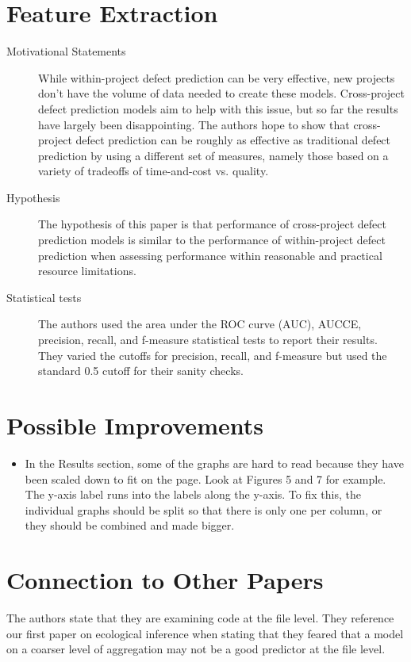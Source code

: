 \documentclass[english]{article}
\begin{document}
\section*{Feature Extraction}
\begin{description}
\item[{Motivational Statements}]  While within-project defect prediction can be very effective, new projects don't have the volume of data needed to create these models. Cross-project defect prediction models aim to help with this issue, but so far the results have largely been disappointing. The authors hope to show that cross-project defect prediction can be roughly as effective as traditional defect prediction by using a different set of measures, namely those based on a variety of tradeoffs of time-and-cost vs. quality.
\item[{Hypothesis}] The hypothesis of this paper is that performance of cross-project defect prediction models is similar to the performance of within-project defect prediction when assessing performance within reasonable and practical resource limitations.
\item[{Statistical tests}] The authors used the area under the ROC curve (AUC), AUCCE, precision, recall, and f-measure statistical tests to report their results. They varied the cutoffs for precision, recall, and f-measure but used the standard 0.5 cutoff for their sanity checks.


\end{description}


\section*{Possible Improvements}
\begin{itemize}
\item In the Results section, some of the graphs are hard to read because they have been scaled down to fit on the page. Look at Figures 5 and 7 for example. The y-axis label runs into the labels along the y-axis. To fix this, the individual graphs should be split so that there is only one per column, or they should be combined and made bigger.
\end{itemize}

\section*{Connection to Other Papers}
The authors state that they are examining code at the file level. They reference our first paper on ecological inference \cite{Posnett} when stating that they feared that a model on a coarser level of aggregation may not be a good predictor at the file level. 



\end{document}
